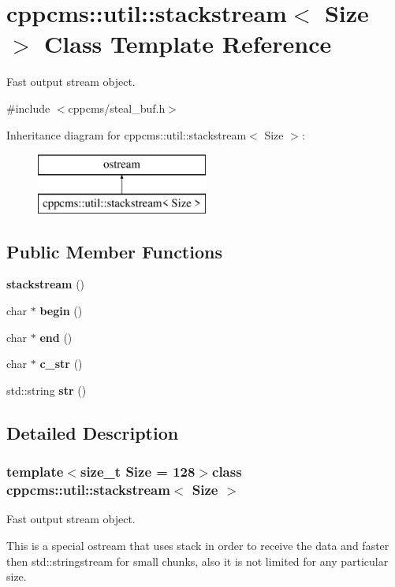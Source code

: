 \section{cppcms\-:\-:util\-:\-:stackstream$<$ Size $>$ Class Template Reference}
\label{classcppcms_1_1util_1_1stackstream}


Fast output stream object.  




{\ttfamily \#include $<$cppcms/steal\-\_\-buf.\-h$>$}

Inheritance diagram for cppcms\-:\-:util\-:\-:stackstream$<$ Size $>$\-:\begin{figure}[H]
\begin{center}
\leavevmode
\includegraphics[height=2.000000cm]{classcppcms_1_1util_1_1stackstream}
\end{center}
\end{figure}
\subsection*{Public Member Functions}
\begin{DoxyCompactItemize}
\item 
{\bf stackstream} ()
\item 
char $\ast$ {\bf begin} ()
\item 
char $\ast$ {\bf end} ()
\item 
char $\ast$ {\bf c\-\_\-str} ()
\item 
std\-::string {\bf str} ()
\end{DoxyCompactItemize}


\subsection{Detailed Description}
\subsubsection*{template$<$size\-\_\-t Size = 128$>$class cppcms\-::util\-::stackstream$<$ Size $>$}

Fast output stream object. 

This is a special ostream that uses stack in order to receive the data and faster then std\-::stringstream for small chunks, also it is not limited for any particular size. 

